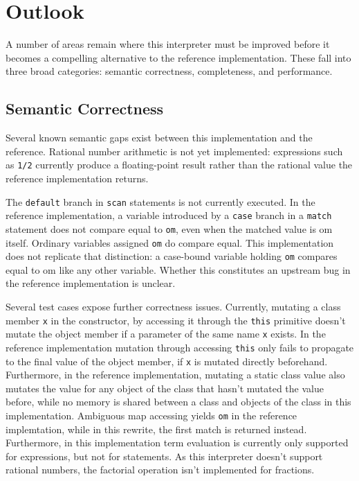 \section{Outlook}

A number of areas remain where this interpreter must be improved before it becomes a compelling alternative to the reference implementation. These fall into three broad categories: semantic correctness, completeness, and performance.

\subsection{Semantic Correctness}

Several known semantic gaps exist between this implementation and the reference. Rational number arithmetic is not yet implemented: expressions such as \texttt{1/2} currently produce a floating-point result rather than the rational value the reference implementation returns.

The \texttt{default} branch in \texttt{scan} statements is not currently executed. In the reference implementation, a variable introduced by a \texttt{case} branch in a \texttt{match} statement does not compare equal to \texttt{om}, even when the matched value is om itself. Ordinary variables assigned \texttt{om} do compare equal. This implementation does not replicate that distinction: a case-bound variable holding \texttt{om} compares equal to om like any other variable. Whether this constitutes an upstream bug in the reference implementation is unclear.

Several test cases expose further correctness issues. Currently, mutating a class member \texttt{x} in the constructor, by accessing it through the \texttt{this} primitive doesn't mutate the object member if a parameter of the same name \texttt{x} exists. In the reference implementation mutation through accessing \texttt{this} only fails to propagate to the final value of the object member, if \texttt{x} is mutated directly beforehand. Furthermore, in the reference implementation, mutating a static class value also mutates the value for any object of the class that hasn't mutated the value before, while no memory is shared between a class and objects of the class in this implementation. Ambiguous map accessing yields \texttt{om} in the reference implemtation, while in this rewrite, the first match is returned instead. Furthermore, in this implementation term evaluation is currently only supported for expressions, but not for statements. As this interpreter doesn't support rational numbers, the factorial operation isn't implemented for fractions.


